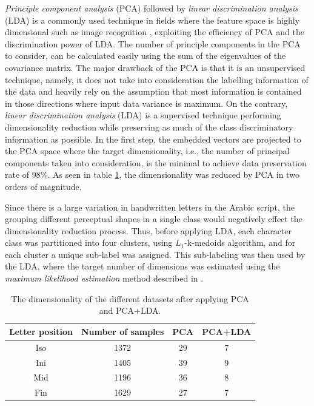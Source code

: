 \documentclass[10pt, conference, compsocconf]{IEEEtran}
\begin{document}
\emph{Principle component analysis} (PCA) followed by \emph{linear discrimination analysis} (LDA) is a commonly used technique in fields where the feature space is highly dimensional such as image recognition \cite{yu2001direct,yang2003can}, exploiting the efficiency of PCA and the discrimination power of LDA.
The number of principle components in the PCA to consider, can be calculated easily using the sum of the eigenvalues of the covariance matrix.
The major drawback of the PCA is that it is an unsupervised technique, namely, it does not take into consideration the labelling information of the data and heavily rely on the assumption that most information is contained in those directions where input data variance is maximum.
On the contrary, \emph{linear discrimination analysis} (LDA) \cite{fisher1936use} is a supervised technique performing dimensionality reduction while preserving as much of the class discriminatory information as possible. 
In the first step, the embedded vectors are projected to the PCA space where the target dimensionality, i.e., the number of principal components taken into consideration, is the minimal to achieve data preservation rate of 98\%.
As seen in table \ref{table:dr_dimensions_results}, the dimensionality was reduced by PCA in two orders of magnitude.

Since there is a large variation in handwritten letters in the Arabic script, the grouping different perceptual shapes in a single class would negatively effect the dimensionality reduction process.
Thus, before applying LDA, each character class was partitioned into four clusters, using $L_1$-k-medoids algorithm, and for each cluster a unique sub-label was assigned. 
This sub-labeling was then used by the LDA, where the target number of dimensions was estimated using the \emph{maximum likelihood estimation} method described in \cite{levina2004maximum}.

\begin{table}
\centering
\begin{tabular}{ | c | c | c | c |}
\hline
Letter position & Number of samples & PCA & PCA+LDA\\
\hline                 
  Iso & 1372 & 29 & 7 \\ 
  \hline
  Ini & 1405 & 39 & 9 \\ 
  \hline
  Mid & 1196 & 36 & 8 \\ 
  \hline
  Fin & 1629 & 27 & 7 \\ 
  \hline
\end{tabular}
\caption{The dimensionality of the different datasets after applying PCA and PCA+LDA.}
\label{table:dr_dimensions_results} 
\end{table}
\end{document}
